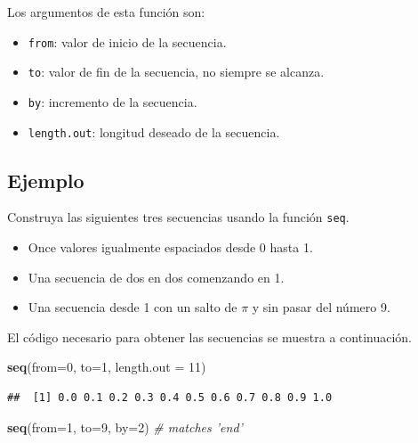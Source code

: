 \documentclass[10pt,]{krantz}
\makeatletter
\newenvironment{Shaded}{\begin{snugshade}}{\end{snugshade}}
\newcommand{\KeywordTok}[1]{\textcolor[rgb]{0.13,0.29,0.53}{\textbf{{#1}}}}
\newcommand{\DataTypeTok}[1]{\textcolor[rgb]{0.13,0.29,0.53}{{#1}}}
\newcommand{\DecValTok}[1]{\textcolor[rgb]{0.00,0.00,0.81}{{#1}}}
\newcommand{\CommentTok}[1]{\textcolor[rgb]{0.56,0.35,0.01}{\textit{{#1}}}}
\newcommand{\NormalTok}[1]{{#1}}
\providecommand{\tightlist}{%
  \setlength{\itemsep}{0pt}\setlength{\parskip}{0pt}}
\newenvironment{kframe}{%
\medskip{}
\setlength{\fboxsep}{.8em}
 \def\at@end@of@kframe{}%
 \ifinner\ifhmode%
  \def\at@end@of@kframe{\end{minipage}}%
  \begin{minipage}{\columnwidth}%
 \fi\fi%
 \def\FrameCommand##1{\hskip\@totalleftmargin \hskip-\fboxsep
 \colorbox{shadecolor}{##1}\hskip-\fboxsep
     \hskip-\linewidth \hskip-\@totalleftmargin \hskip\columnwidth}%
 \MakeFramed {\advance\hsize-\width
   \@totalleftmargin\z@ \linewidth\hsize
   \@setminipage}}%
 {\par\unskip\endMakeFramed%
 \at@end@of@kframe}
\renewenvironment{Shaded}{\begin{kframe}}{\end{kframe}}
\makeatother
\begin{document}
Los argumentos de esta función son:

\begin{itemize}
\tightlist
\item
  \texttt{from}: valor de inicio de la secuencia.
\item
  \texttt{to}: valor de fin de la secuencia, no siempre se alcanza.
\item
  \texttt{by}: incremento de la secuencia.
\item
  \texttt{length.out}: longitud deseado de la secuencia.
\end{itemize}

\subsection*{Ejemplo}\label{ejemplo-10}


Construya las siguientes tres secuencias usando la función \texttt{seq}.

\begin{itemize}
\tightlist
\item
  Once valores igualmente espaciados desde 0 hasta 1.
\item
  Una secuencia de dos en dos comenzando en 1.
\item
  Una secuencia desde 1 con un salto de \(\pi\) y sin pasar del número
  9.
\end{itemize}

El código necesario para obtener las secuencias se muestra a
continuación.

\begin{Shaded}
\begin{Highlighting}[]
\KeywordTok{seq}\NormalTok{(}\DataTypeTok{from=}\DecValTok{0}\NormalTok{, }\DataTypeTok{to=}\DecValTok{1}\NormalTok{, }\DataTypeTok{length.out =} \DecValTok{11}\NormalTok{)}
\end{Highlighting}
\end{Shaded}

\begin{verbatim}
##  [1] 0.0 0.1 0.2 0.3 0.4 0.5 0.6 0.7 0.8 0.9 1.0
\end{verbatim}

\begin{Shaded}
\begin{Highlighting}[]
\KeywordTok{seq}\NormalTok{(}\DataTypeTok{from=}\DecValTok{1}\NormalTok{, }\DataTypeTok{to=}\DecValTok{9}\NormalTok{, }\DataTypeTok{by=}\DecValTok{2}\NormalTok{)  }\CommentTok{# matches 'end'}
\end{Highlighting}
\end{Shaded}
\end{document}
